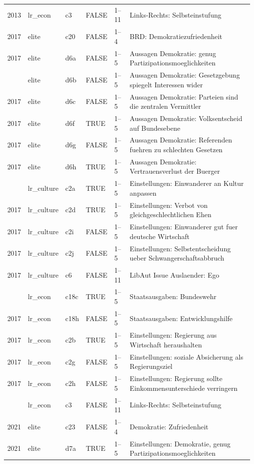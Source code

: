 \begin{longtable}[t]{rlllll}
2013 & lr\_econ & c3 & FALSE & 1–11 & Links-Rechts: Selbsteinstufung\\
2017 & elite & c20 & FALSE & 1–4 & BRD: Demokratiezufriedenheit\\
2017 & elite & d6a & FALSE & 1–5 & Aussagen Demokratie: genug Partizipationsmoeglichkeiten\\
\addlinespace
2017 & elite & d6b & FALSE & 1–5 & Aussagen Demokratie: Gesetzgebung spiegelt Interessen wider\\
2017 & elite & d6c & FALSE & 1–5 & Aussagen Demokratie: Parteien sind die zentralen Vermittler\\
2017 & elite & d6f & TRUE & 1–5 & Aussagen Demokratie: Volksentscheid auf Bundesebene\\
2017 & elite & d6g & FALSE & 1–5 & Aussagen Demokratie: Referenden fuehren zu schlechten Gesetzen\\
2017 & elite & d6h & TRUE & 1–5 & Aussagen Demokratie: Vertrauensverlust der Buerger\\
\addlinespace
2017 & lr\_culture & c2a & TRUE & 1–5 & Einstellungen: Einwanderer an Kultur anpassen\\
2017 & lr\_culture & c2d & TRUE & 1–5 & Einstellungen: Verbot von gleichgeschlechtlichen Ehen\\
2017 & lr\_culture & c2i & FALSE & 1–5 & Einstellungen: Einwanderer gut fuer deutsche Wirtschaft\\
2017 & lr\_culture & c2j & FALSE & 1–5 & Einstellungen: Selbstentscheidung ueber Schwangerschaftsabbruch\\
2017 & lr\_culture & c6 & FALSE & 1–11 & LibAut Issue Auslaender: Ego\\
\addlinespace
2017 & lr\_econ & c18c & TRUE & 1–5 & Staatsausgaben: Bundeswehr\\
2017 & lr\_econ & c18h & FALSE & 1–5 & Staatsausgaben: Entwicklungshilfe\\
2017 & lr\_econ & c2b & TRUE & 1–5 & Einstellungen: Regierung aus Wirtschaft heraushalten\\
2017 & lr\_econ & c2g & FALSE & 1–5 & Einstellungen: soziale Absicherung als Regierungsziel\\
2017 & lr\_econ & c2h & FALSE & 1–5 & Einstellungen: Regierung sollte Einkommensunterschiede verringern\\
\addlinespace
2017 & lr\_econ & c3 & FALSE & 1–11 & Links-Rechts: Selbsteinstufung\\
2021 & elite & c23 & FALSE & 1–4 & Demokratie: Zufriedenheit\\
2021 & elite & d7a & TRUE & 1–5 & Einstellungen: Demokratie, genug Partizipationsmoeglichkeiten\\

\end{longtable}
